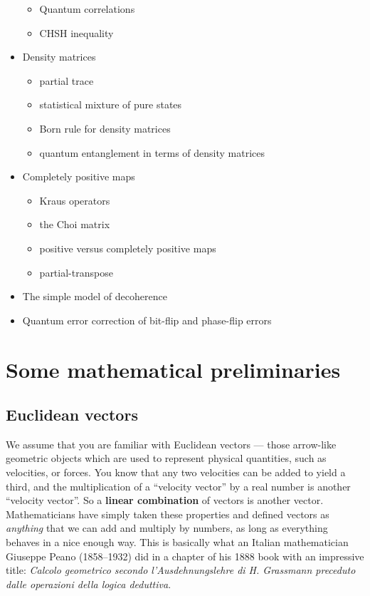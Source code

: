 \documentclass[fleqn]{article}
\providecommand{\tightlist}{%
  \setlength{\itemsep}{0pt}\setlength{\parskip}{0pt}}
\let\oldsection\section
\renewcommand\section{\clearpage\oldsection}
\begin{document}
\begin{itemize}
  \begin{itemize}
  \tightlist
  \item
    Quantum correlations
  \item
    CHSH inequality
  \end{itemize}
\item
  Density matrices

  \begin{itemize}
  \tightlist
  \item
    partial trace
  \item
    statistical mixture of pure states
  \item
    Born rule for density matrices
  \item
    quantum entanglement in terms of density matrices
  \end{itemize}
\item
  Completely positive maps

  \begin{itemize}
  \tightlist
  \item
    Kraus operators
  \item
    the Choi matrix
  \item
    positive versus completely positive maps
  \item
    partial-transpose
  \end{itemize}
\item
  The simple model of decoherence
\item
  Quantum error correction of bit-flip and phase-flip errors
\end{itemize}

\hypertarget{some-mathematical-preliminaries}{%
\section*{Some mathematical preliminaries}\label{some-mathematical-preliminaries}}

\hypertarget{euclidean-vectors}{%
\subsection{Euclidean vectors}\label{euclidean-vectors}}

We assume that you are familiar with Euclidean vectors --- those arrow-like geometric objects which are used to represent physical quantities, such as velocities, or forces.
You know that any two velocities can be added to yield a third, and the multiplication of a ``velocity vector'' by a real number is another ``velocity vector''.
So a \textbf{linear combination} of vectors is another vector.
Mathematicians have simply taken these properties and defined vectors as \emph{anything} that we can add and multiply by numbers, as long as everything behaves in a nice enough way.
This is basically what an Italian mathematician Giuseppe Peano (1858--1932) did in a chapter of his 1888 book with an impressive title: \emph{Calcolo geometrico secondo l'Ausdehnungslehre di H. Grassmann preceduto dalle operazioni della logica deduttiva}.
\end{document}
